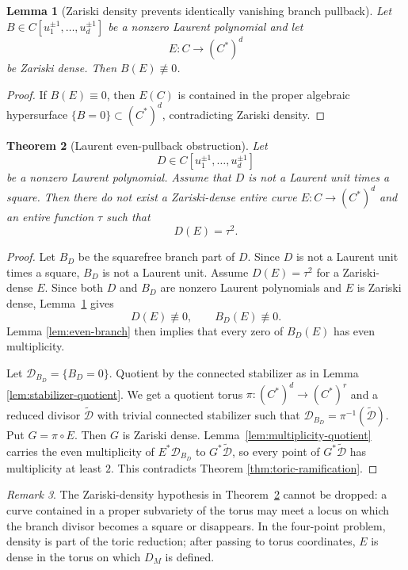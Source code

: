 \documentclass[11pt]{amsart}
\def\CC{C}%
\numberwithin{equation}{section}
\newtheorem{theorem}{Theorem}[section]
\newtheorem{lemma}[theorem]{Lemma}
\theoremstyle{definition}
\theoremstyle{remark}
\newtheorem{remark}[theorem]{Remark}
\newcommand{\CC}{\mathbb C}
\begin{document}
\begin{lemma}[Zariski density prevents identically vanishing branch pullback]\label{lem:branch-not-identically-zero}
Let $B\in\CC[u_1^{\pm1},\dots,u_d^{\pm1}]$ be a nonzero Laurent polynomial and let
\[
E:\CC\to(\CC^*)^d
\]
be Zariski dense. Then $B(E)\not\equiv0$.
\end{lemma}

\begin{proof}
If $B(E)\equiv0$, then $E(\CC)$ is contained in the proper algebraic hypersurface $\{B=0\}\subset(\CC^*)^d$, contradicting Zariski density.
\end{proof}

\begin{theorem}[Laurent even-pullback obstruction]\label{thm:laurent-even-pullback}
Let
\[
D\in\CC[u_1^{\pm1},\dots,u_d^{\pm1}]
\]
be a nonzero Laurent polynomial. Assume that $D$ is not a Laurent unit times a square. Then there do not exist a Zariski-dense entire curve $E:\CC\to(\CC^*)^d$ and an entire function $\tau$ such that
\[
D(E)=\tau^2.
\]
\end{theorem}

\begin{proof}
Let $B_D$ be the squarefree branch part of $D$. Since $D$ is not a Laurent unit times a square, $B_D$ is not a Laurent unit. Assume $D(E)=\tau^2$ for a Zariski-dense $E$. Since both $D$ and $B_D$ are nonzero Laurent polynomials and $E$ is Zariski dense, Lemma~\ref{lem:branch-not-identically-zero} gives
\[
D(E)\not\equiv0,
\qquad
B_D(E)\not\equiv0.
\]
Lemma \ref{lem:even-branch} then implies that every zero of $B_D(E)$ has even multiplicity.

Let $\mathcal D_{B_D}=\{B_D=0\}$. Quotient by the connected stabilizer as in Lemma \ref{lem:stabilizer-quotient}. We get a quotient torus $\pi:(\CC^*)^d\to(\CC^*)^r$ and a reduced divisor $\widetilde{\mathcal D}$ with trivial connected stabilizer such that $\mathcal D_{B_D}=\pi^{-1}(\widetilde{\mathcal D})$. Put $G=\pi\circ E$. Then $G$ is Zariski dense.  Lemma~\ref{lem:multiplicity-quotient} carries the even multiplicity of $E^*\mathcal D_{B_D}$ to $G^*\widetilde{\mathcal D}$, so every point of $G^*\widetilde{\mathcal D}$ has multiplicity at least $2$. This contradicts Theorem \ref{thm:toric-ramification}.
\end{proof}

\begin{remark}
The Zariski-density hypothesis in Theorem~\ref{thm:laurent-even-pullback} cannot be dropped: a curve contained in a proper subvariety of the torus may meet a locus on which the branch divisor becomes a square or disappears.  In the four-point problem, density is part of the toric reduction; after passing to torus coordinates, $E$ is dense in the torus on which $D_M$ is defined.
\end{remark}
\end{document}
